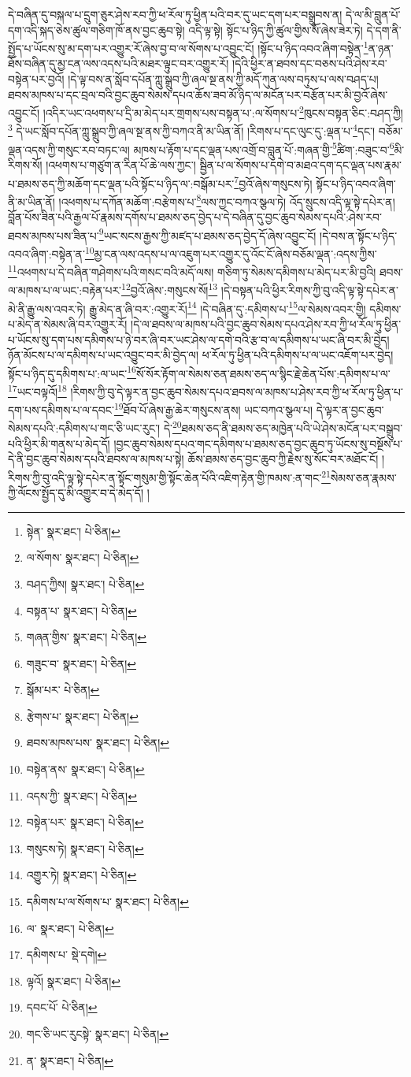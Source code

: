 དེ་བཞིན་དུ་བསྐལ་པ་དྲུག་ཅུར་ཤེས་རབ་ཀྱི་ཕ་རོལ་ཏུ་ཕྱིན་པའི་བར་དུ་ཡང་དག་པར་བསྒྲུབས་ན། དེ་ལ་མི་བླུན་པོ་དག་འདི་སྐད་ཅེས་ཚུལ་གཅིག་ཁོ་ནས་བྱང་ཆུབ་སྟེ། འདི་ལྟ་སྟེ། སྟོང་པ་ཉིད་ཀྱི་ཚུལ་གྱིས་སོ་ཞེས་ཟེར་ཏེ། དེ་དག་ནི་སྤྱོད་པ་ཡོངས་སུ་མ་དག་པར་འགྱུར་རོ་ཞེས་བྱ་བ་ལ་སོགས་པ་འབྱུང་ངོ། །སྟོང་པ་ཉིད་འབའ་ཞིག་བསྟེན་\footnote{སྟེན་  སྣར་ཐང་།  པེ་ཅིན། }ན་ཉན་ཐོས་བཞིན་དུ་མྱ་ངན་ལས་འདས་པའི་མཐར་ལྟུང་བར་འགྱུར་རོ། །དེའི་ཕྱིར་ན་ཐབས་དང་བཅས་པའི་ཤེས་རབ་བསྟེན་པར་བྱའོ། །དེ་ལྟ་བས་ན་སློབ་དཔོན་ཀླུ་སྒྲུབ་ཀྱི་ཞལ་སྔ་ནས་ཀྱི་མདོ་ཀུན་ལས་བཏུས་པ་ལས་བཤད་པ། ཐབས་མཁས་པ་དང་བྲལ་བའི་བྱང་ཆུབ་སེམས་དཔའ་ཆོས་ཟབ་མོ་ཉིད་ལ་མངོན་པར་བརྩོན་པར་མི་བྱའོ་ཞེས་འབྱུང་ངོ། །འདིར་ཡང་འཕགས་པ་དྲི་མ་མེད་པར་གྲགས་པས་བསྟན་པ་:ལ་སོགས་པ་\footnote{ལ་སོགས་  སྣར་ཐང་།  པེ་ཅིན། }ཁུངས་བསྟན་ཅིང་:བཤད་ཀྱི།\footnote{བཤད་ཀྱིས།  སྣར་ཐང་།  པེ་ཅིན། } དེ་ཡང་སློབ་དཔོན་ཀླུ་སྒྲུབ་ཀྱི་ཞལ་སྔ་ནས་ཀྱི་བཀའ་ནི་མ་ཡིན་ནོ། །རིགས་པ་དང་ལུང་དུ་:ལྡན་པ་\footnote{བསྟན་པ་  སྣར་ཐང་།  པེ་ཅིན། }དང་། བཅོམ་ལྡན་འདས་ཀྱི་གསུང་རབ་བཏང་ལ། མཁས་པ་རྟོག་པ་དང་ལྡན་པས་འགྲོ་བ་བླུན་པོ་:གཞན་གྱི་\footnote{གཞན་གྱིས་  སྣར་ཐང་།  པེ་ཅིན། }ཚིག་:བཟུང་བ་\footnote{གཟུང་བ་  སྣར་ཐང་།  པེ་ཅིན། }མི་རིགས་སོ། །འཕགས་པ་གཙུག་ན་རིན་པོ་ཆེ་ལས་ཀྱང་། སྦྱིན་པ་ལ་སོགས་པ་དགེ་བ་མཐའ་དག་དང་ལྡན་པས་རྣམ་པ་ཐམས་ཅད་ཀྱི་མཆོག་དང་ལྡན་པའི་སྟོང་པ་ཉིད་ལ་:བསྒོམ་པར་\footnote{སྒོམ་པར་  པེ་ཅིན། }བྱའོ་ཞེས་གསུངས་ཏེ། སྟོང་པ་ཉིད་འབའ་ཞིག་ནི་མ་ཡིན་ནོ། །འཕགས་པ་དཀོན་མཆོག་:བརྩེགས་པ་\footnote{རྩེགས་པ་  སྣར་ཐང་།  པེ་ཅིན། }ལས་ཀྱང་བཀའ་སྩལ་ཏེ། འོད་སྲུངས་འདི་ལྟ་སྟེ་དཔེར་ན། བློན་པོས་ཟིན་པའི་རྒྱལ་པོ་རྣམས་དགོས་པ་ཐམས་ཅད་བྱེད་པ་དེ་བཞིན་དུ་བྱང་ཆུབ་སེམས་དཔའི་:ཤེས་རབ་ཐབས་མཁས་པས་ཟིན་པ་\footnote{ཐབས་མཁས་པས་  སྣར་ཐང་།  པེ་ཅིན། }ཡང་སངས་རྒྱས་ཀྱི་མཛད་པ་ཐམས་ཅད་བྱེད་དོ་ཞེས་འབྱུང་ངོ། །དེ་བས་ན་སྟོང་པ་ཉིད་འབའ་ཞིག་:བསྟེན་ན་\footnote{བསྟེན་ནས་  སྣར་ཐང་།  པེ་ཅིན། }མྱ་ངན་ལས་འདས་པ་ལ་འཇུག་པར་འགྱུར་དུ་འོང་ངོ་ཞེས་བཅོམ་ལྡན་:འདས་ཀྱིས་\footnote{འདས་ཀྱི་  སྣར་ཐང་།  པེ་ཅིན། }འཕགས་པ་དེ་བཞིན་གཤེགས་པའི་གསང་བའི་མདོ་ལས། གཅིག་ཏུ་སེམས་དམིགས་པ་མེད་པར་མི་བྱའི། ཐབས་ལ་མཁས་པ་ལ་ཡང་:བརྟེན་པར་\footnote{བསྟེན་པར་  སྣར་ཐང་།  པེ་ཅིན། }བྱའོ་ཞེས་:གསུངས་སོ།\footnote{གསུངས་ཏེ།  སྣར་ཐང་།  པེ་ཅིན། } །དེ་བསྟན་པའི་ཕྱིར་རིགས་ཀྱི་བུ་འདི་ལྟ་སྟེ་དཔེར་ན་མེ་ནི་རྒྱུ་ལས་འབར་ཏེ། རྒྱུ་མེད་ན་ཞི་བར་:འགྱུར་རོ།\footnote{འགྱུར་ཏེ།  སྣར་ཐང་།  པེ་ཅིན། } །དེ་བཞིན་དུ་:དམིགས་པ་\footnote{དམིགས་པ་ལ་སོགས་པ་  སྣར་ཐང་།  པེ་ཅིན། }ལ་སེམས་འབར་གྱི། དམིགས་པ་མེད་ན་སེམས་ཞི་བར་འགྱུར་རོ། །དེ་ལ་ཐབས་ལ་མཁས་པའི་བྱང་ཆུབ་སེམས་དཔའ་ཤེས་རབ་ཀྱི་ཕ་རོལ་ཏུ་ཕྱིན་པ་ཡོངས་སུ་དག་པས་དམིགས་པ་ཉེ་བར་ཞི་བར་ཡང་ཤེས་ལ་དགེ་བའི་རྩ་བ་ལ་དམིགས་པ་ཡང་ཞི་བར་མི་བྱེད། ཉོན་མོངས་པ་ལ་དམིགས་པ་ཡང་འབྱུང་བར་མི་བྱེད་ལ། ཕ་རོལ་ཏུ་ཕྱིན་པའི་དམིགས་པ་ལ་ཡང་འཇོག་པར་བྱེད། སྟོང་པ་ཉིད་དུ་དམིགས་པ་:ལ་ཡང་\footnote{ལ་  སྣར་ཐང་།  པེ་ཅིན། }སོ་སོར་རྟོག་ལ་སེམས་ཅན་ཐམས་ཅད་ལ་སྙིང་རྗེ་ཆེན་པོས་:དམིགས་པ་ལ་\footnote{དམིགས་པ་  སྡེ་དགེ། }ཡང་བལྟའོ།\footnote{ལྟའོ།  སྣར་ཐང་།  པེ་ཅིན། } །རིགས་ཀྱི་བུ་དེ་ལྟར་ན་བྱང་ཆུབ་སེམས་དཔའ་ཐབས་ལ་མཁས་པ་ཤེས་རབ་ཀྱི་ཕ་རོལ་ཏུ་ཕྱིན་པ་དག་པས་དམིགས་པ་ལ་དབང་\footnote{དབང་པོ་  པེ་ཅིན། }ཐོབ་པོ་ཞེས་རྒྱ་ཆེར་གསུངས་ནས། ཡང་བཀའ་སྩལ་པ། དེ་ལྟར་ན་བྱང་ཆུབ་སེམས་དཔའི་:དམིགས་པ་གང་ཅི་ཡང་རུང་། དེ་\footnote{གང་ཅི་ཡང་རུངསྟེ་  སྣར་ཐང་།  པེ་ཅིན། }ཐམས་ཅད་ནི་ཐམས་ཅད་མཁྱེན་པའི་ཡེ་ཤེས་མངོན་པར་བསྒྲུབ་པའི་ཕྱིར་མི་གནས་པ་མེད་དོ། །བྱང་ཆུབ་སེམས་དཔའ་གང་དམིགས་པ་ཐམས་ཅད་བྱང་ཆུབ་ཏུ་ཡོངས་སུ་བསྔོས་པ་དེ་ནི་བྱང་ཆུབ་སེམས་དཔའི་ཐབས་ལ་མཁས་པ་སྟེ། ཆོས་ཐམས་ཅད་བྱང་ཆུབ་ཀྱི་རྗེས་སུ་སོང་བར་མཐོང་ངོ། །རིགས་ཀྱི་བུ་འདི་ལྟ་སྟེ་དཔེར་ན་སྟོང་གསུམ་གྱི་སྟོང་ཆེན་པོའི་འཇིག་རྟེན་གྱི་ཁམས་:ན་གང་\footnote{ན་  སྣར་ཐང་།  པེ་ཅིན། }སེམས་ཅན་རྣམས་ཀྱི་ལོངས་སྤྱོད་དུ་མི་འགྱུར་བ་དེ་མེད་དོ། །

